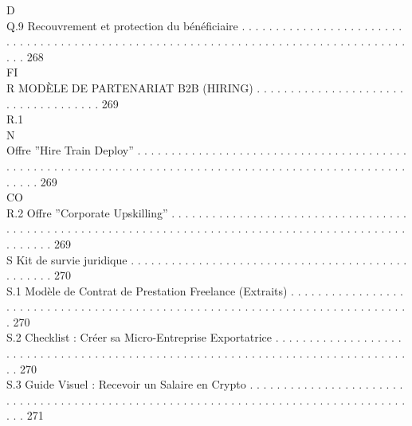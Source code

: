 \vspace{0.5em}
\vspace{0.5em}
\vspace{0.5em}
\vspace{0.5em}
D\\
Q.9     Recouvrement et protection du bénéficiaire . . . . . . . . . . . . . . . . . . . . . . . . . . . . . . . . . . . . . . . . . . . . . . . . . . . . . . . . . . . . . . . . . . . . . . . . . . . . . . . . . . . . . . 268\\
\vspace{0.5em}
\vspace{0.5em}
\vspace{0.5em}
\vspace{0.5em}
FI\\
R     MODÈLE DE PARTENARIAT B2B (HIRING) . . . . . . . . . . . . . . . . . . . . . . . . . . . . . . . . . . . . 269\\
R.1\\
N\\
Offre ”Hire Train Deploy” . . . . . . . . . . . . . . . . . . . . . . . . . . . . . . . . . . . . . . . . . . . . . . . . . . . . . . . . . . . . . . . . . . . . . . . . . . . . . . . . . . . . . . . . . . . . . . . . . . . . . . . . 269\\
CO\\
R.2     Offre ”Corporate Upskilling” . . . . . . . . . . . . . . . . . . . . . . . . . . . . . . . . . . . . . . . . . . . . . . . . . . . . . . . . . . . . . . . . . . . . . . . . . . . . . . . . . . . . . . . . . . . . . . . . . . . . . 269\\
\vspace{0.5em}
S     Kit de survie juridique . . . . . . . . . . . . . . . . . . . . . . . . . . . . . . . . . . . . . . . . . . . . . . . . 270\\
S.1     Modèle de Contrat de Prestation Freelance (Extraits) . . . . . . . . . . . . . . . . . . . . . . . . . . . . . . . . . . . . . . . . . . . . . . . . . . . . . . . . . . . . . . . . . . . . . . . . . . . . . 270\\
S.2     Checklist : Créer sa Micro-Entreprise Exportatrice . . . . . . . . . . . . . . . . . . . . . . . . . . . . . . . . . . . . . . . . . . . . . . . . . . . . . . . . . . . . . . . . . . . . . . . . . . . . . . . . 270\\
S.3     Guide Visuel : Recevoir un Salaire en Crypto . . . . . . . . . . . . . . . . . . . . . . . . . . . . . . . . . . . . . . . . . . . . . . . . . . . . . . . . . . . . . . . . . . . . . . . . . . . . . . . . . . . . . 271\\

